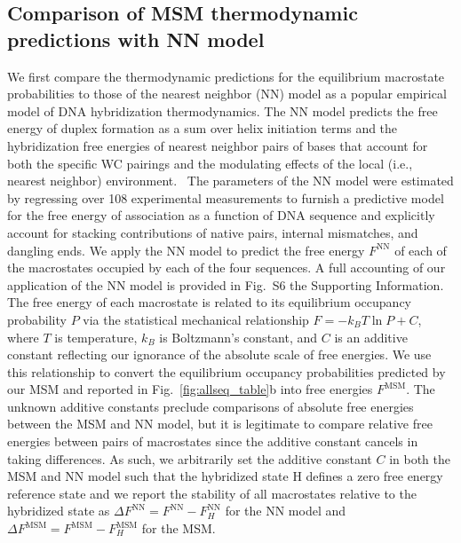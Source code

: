 \documentclass[journal=jpcbfk,manuscript=article]{achemso}
\newcommand*{\rood}[1]{{\color{red}{#1}}}
\newcommand*{\blauw}[1]{{#1}}
\begin{document}
\subsection{Comparison of MSM thermodynamic predictions with NN model} \label{sec:NN}

We first compare the thermodynamic predictions for the equilibrium macrostate probabilities \rood{made by the MSM models fitted at the sequence melting temperatures} to those of the nearest neighbor (NN) model as a popular empirical model of DNA hybridization thermodynamics. The NN model predicts the free energy of duplex formation as a sum over helix initiation terms and the hybridization free energies of nearest neighbor pairs of bases that account for both the specific WC pairings and the modulating effects of the local (i.e., nearest neighbor) environment.~\citep{SantaLucia1998AThermodynamics, Santalucia2004TheMotifs} The parameters of the NN model were estimated by regressing over 108 experimental measurements to furnish a predictive model for the free energy of association as a function of DNA sequence and explicitly account for stacking contributions of native pairs, internal mismatches, and dangling ends. We apply the NN model to predict the free energy $F^\mathrm{NN}$ of each of the macrostates occupied by each of the four sequences. A full accounting of our application of the NN model is provided in \blauw{Fig.~S6} \rood{and supporting text within} the \blauw{Supporting Information}. The free energy of each macrostate is related to its equilibrium occupancy probability $P$ via the statistical mechanical relationship $F = -k_B T \ln P + C$, where $T$ is temperature, $k_B$ is Boltzmann's constant, and $C$ is an additive constant reflecting our ignorance of the absolute scale of free energies. We use this relationship to convert the equilibrium occupancy probabilities predicted by our MSM and reported in Fig.~\ref{fig:allseq_table}b into free energies $F^\mathrm{MSM}$. The unknown additive constants preclude comparisons of absolute free energies between the MSM and NN model, but it is legitimate to compare relative free energies between pairs of macrostates since the additive constant cancels in taking differences. As such, we arbitrarily set the additive constant $C$ in both the MSM and NN model such that the hybridized state H defines a zero free energy reference state and we report the stability of all macrostates relative to the hybridized state as $\Delta F^\mathrm{NN} = F^\mathrm{NN} - F_H^\mathrm{NN}$ for the NN model and $\Delta F^\mathrm{MSM} = F^\mathrm{MSM} - F_H^\mathrm{MSM}$ for the MSM. 
\end{document}
